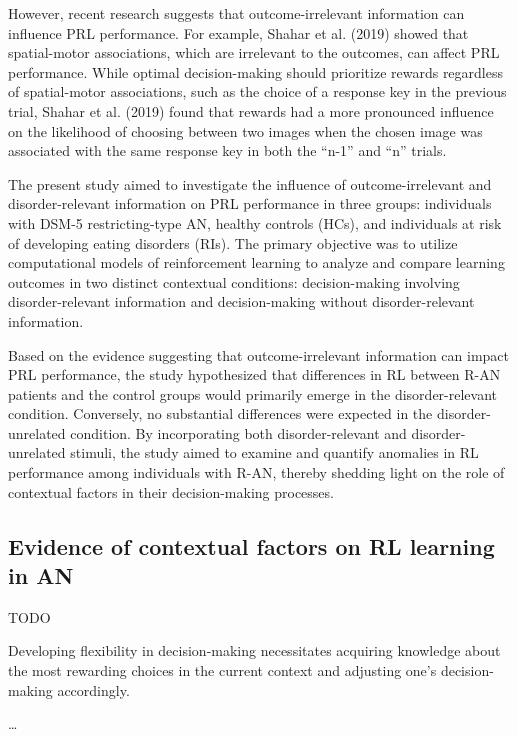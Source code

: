\documentclass[
  man,floatsintext]{apa6}
\begin{document}
However, recent research suggests that outcome-irrelevant information can influence PRL performance. For example, Shahar et al. (2019) showed that spatial-motor associations, which are irrelevant to the outcomes, can affect PRL performance. While optimal decision-making should prioritize rewards regardless of spatial-motor associations, such as the choice of a response key in the previous trial, Shahar et al. (2019) found that rewards had a more pronounced influence on the likelihood of choosing between two images when the chosen image was associated with the same response key in both the ``n-1'' and ``n'' trials.

The present study aimed to investigate the influence of outcome-irrelevant and disorder-relevant information on PRL performance in three groups: individuals with DSM-5 restricting-type AN, healthy controls (HCs), and individuals at risk of developing eating disorders (RIs). The primary objective was to utilize computational models of reinforcement learning to analyze and compare learning outcomes in two distinct contextual conditions: decision-making involving disorder-relevant information and decision-making without disorder-relevant information.

Based on the evidence suggesting that outcome-irrelevant information can impact PRL performance, the study hypothesized that differences in RL between R-AN patients and the control groups would primarily emerge in the disorder-relevant condition. Conversely, no substantial differences were expected in the disorder-unrelated condition. By incorporating both disorder-relevant and disorder-unrelated stimuli, the study aimed to examine and quantify anomalies in RL performance among individuals with R-AN, thereby shedding light on the role of contextual factors in their decision-making processes.

\hypertarget{evidence-of-contextual-factors-on-rl-learning-in-an}{%
\subsection{Evidence of contextual factors on RL learning in AN}\label{evidence-of-contextual-factors-on-rl-learning-in-an}}

TODO

Developing flexibility in decision-making necessitates acquiring knowledge about the most rewarding choices in the current context and adjusting one's decision-making accordingly.

\ldots{}
\end{document}
